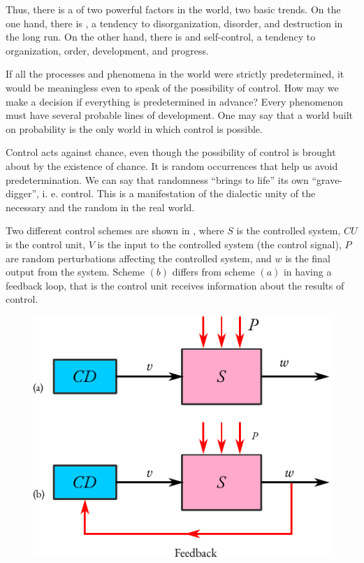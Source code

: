 Thus, there is a  of two powerful factors in the world,
two basic trends. On the one hand, there is , a tendency to
disorganization, disorder, and destruction in the long run. On the other
hand, there is  and self-control, a tendency to organization, order, development, and progress.

 If all the processes and
phenomena in the world were strictly predetermined, it would be
meaningless even to speak of the possibility of control.  How may we make
a decision if everything is predetermined in advance? Every
phenomenon must have several probable lines of development. One may
say that a world built on probability is the only world in which control
is possible.

Control acts against chance, even though the possibility of control is
brought about by the existence of chance. It is random occurrences that
help us avoid predetermination. We can say that randomness ``brings to
life'' its own ``grave-digger'', i. e. control. This is a manifestation of the
dialectic unity of the necessary and the random in the real world.

 Two different control schemes are shown in
 , where $S$ is the controlled system, $CU$ is the control unit, $V$ is the input to the controlled system (the control signal), $P$ are random perturbations affecting the controlled system, and $w$ is the final output
from the system. Scheme $(b)$ differs from scheme $(a)$ in having a feedback
loop, that is the control unit receives information about the results of
control.
\begin{figure}[!ht]
 \centering
 \includegraphics[width=0.75\linewidth]{figures/control-scheme-1.pdf}
 \end{figure}

